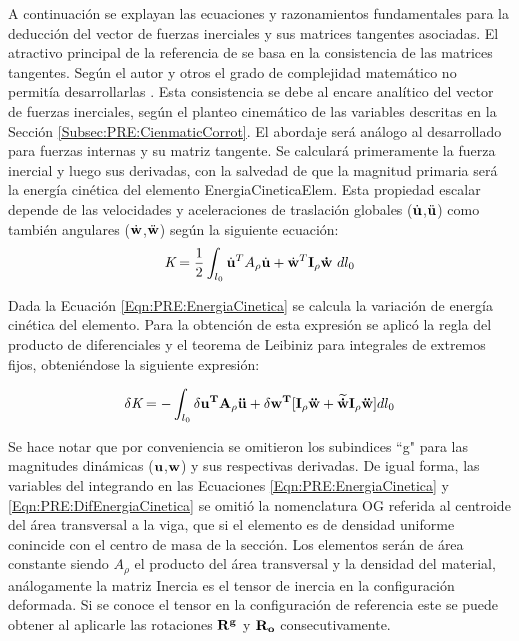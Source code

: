 A continuación se explayan las ecuaciones y razonamientos fundamentales para la deducción del vector de fuerzas inerciales y sus matrices tangentes asociadas. El atractivo principal de la referencia de \cite{Le2014} se basa en la consistencia de las matrices tangentes. Según el autor y otros el grado de complejidad matemático no permitía desarrollarlas \citep{Crisfield}. Esta consistencia se debe al encare analítico del vector de fuerzas inerciales, según el planteo cinemático de las variables descritas en la Sección \ref{Subsec:PRE:CienmaticCorrot}. El abordaje será análogo al desarrollado para fuerzas internas y su matriz tangente. Se calculará primeramente la fuerza inercial y luego sus derivadas, con la salvedad de que la magnitud primaria será la energía cinética del elemento \gls{EnergiaCineticaElem}. Esta propiedad escalar depende de las velocidades y aceleraciones de traslación globales ($\dot{\bf{u}}$,$\ddot{\bf{u}}$) como también angulares ($\dot{\bf{w}}$,$\ddot{\bf{w}}$) según la siguiente ecuación:
\begin{equation}
	\label{Eqn:PRE:EnergiaCinetica}
	\textit{K}=\frac{1}{2}\int_{l_0} {\dot{\bf{u}}^T A_{\rho} \dot{\bf{u}} +
	\dot{\bf{w}}^T \bf{I_{\rho}}\dot{\bf{w}}} ~\text{$dl_0$}
\end{equation}

 Dada la Ecuación \eqref{Eqn:PRE:EnergiaCinetica} se calcula la variación de energía cinética del elemento. Para la obtención de esta expresión se aplicó la regla del producto de diferenciales y el teorema de Leibiniz para integrales de extremos fijos, obteniéndose la siguiente expresión:

\begin{equation}
	\label{Eqn:PRE:DifEnergiaCinetica}
	\delta\textit{K}=-\int_{l_0} \delta \bf{u}^T A_{\rho} \ddot{\bf{u}} +\delta
	\bf{w}^T[\bf{I_{\rho}}\ddot{\bf{w}}+\widetilde{\dot{\bf{w}}}\bf{I_{\rho}}\ddot{\bf{w}}]
	\text{$dl_0$}
\end{equation}


Se hace notar que por conveniencia se omitieron los subindices ``g" para las magnitudes dinámicas ($\bf{u}$,$\bf{w}$) y sus respectivas derivadas. De igual forma, las variables del integrando en las Ecuaciones  \eqref{Eqn:PRE:EnergiaCinetica} y \eqref{Eqn:PRE:DifEnergiaCinetica} se omitió la nomenclatura OG referida al centroide del área transversal a la viga, que si el elemento es de densidad uniforme conincide con el centro de masa de la sección. Los elementos serán de área constante siendo  $A_{\rho}$  el producto del área transversal y la densidad del material, análogamente la matriz \gls{Inercia} es el tensor de inercia en la configuración deformada. Si se conoce el tensor en la configuración de referencia este se puede obtener al aplicarle las rotaciones $\bf{R}^g$ y $\bf{R}_o$ consecutivamente.

